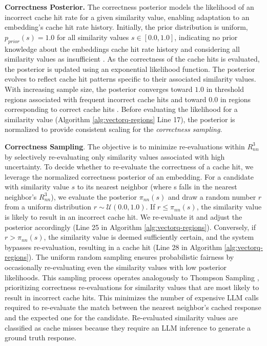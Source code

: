 \textbf{Correctness Posterior.} The correctness posterior models the likelihood of an incorrect cache hit rate for a given similarity value, enabling adaptation to an embedding's cache hit rate history. Initially, the prior distribution is uniform, $p_{prior}(s) = 1.0$ for all similarity values $s \in [0.0, 1.0]$, indicating no prior knowledge about the embeddings cache hit rate history and considering all similarity values as insufficient \cite{thompson1933likelihood}. As the correctness of the cache hits is evaluated, the posterior is updated using an exponential likelihood function. The posterior evolves to reflect cache hit patterns specific to their associated similarity values. With increasing sample size, the posterior converges toward $1.0$ in threshold regions associated with frequent incorrect cache hits and toward $0.0$ in regions corresponding to correct cache hits \cite{Bayes1763-BAYAET}. Before evaluating the likelihood for a similarity value (Algorithm \ref{alg:vectorq-regions} Line 17), the posterior is normalized to provide consistent scaling for the \textit{correctness sampling}.

\textbf{Correctness Sampling}. The objective is to minimize re-evaluations within $R_{nn}^3$ by selectively re-evaluating only similarity values associated with high uncertainty. To decide whether to re-evaluate the correctness of a cache hit, we leverage the normalized correctness posterior of an embedding. For a candidate with similarity value $s$ to its nearest neighbor (where s falls in the nearest neighbor's $R_{nn}^3$), we evaluate the posterior $\pi_{nn}(s)$ and draw a random number $r$ from a uniform distribution $r \sim \mathcal{U}(0.0, 1.0)$. If $r \leq \pi_{nn}(s)$, the similarity value is likely to result in an incorrect cache hit. We re-evaluate it and adjust the posterior accordingly (Line 25 in Algorithm \ref{alg:vectorq-regions}). Conversely, if $r > \pi_{nn}(s)$, the similarity value is deemed sufficiently certain, and the system bypasses re-evaluation, resulting in a cache hit (Line 28 in Algorithm \ref{alg:vectorq-regions}). The uniform random sampling ensures probabilistic fairness by occasionally re-evaluating even the similarity values with low posterior likelihoods. This sampling process operates analogously to Thompson Sampling \cite{thompson1933likelihood}, prioritizing correctness re-evaluations for similarity values that are most likely to result in incorrect cache hits. This minimizes the number of expensive LLM calls required to re-evaluate the match between the nearest neighbor's cached response and the expected one for the candidate. Re-evaluated similarity values are classified as cache misses because they require an LLM inference to generate a ground truth response.  

